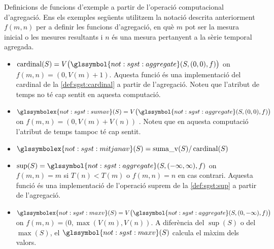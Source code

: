 \begin{example}
  Definicions de funcions d'exemple a partir de l'operació
  computacional d'agregació. Ens els exemples següents utilitzem la
  notació descrita anteriorment $f(m,n)$ per a definir les funcions
  d'agregació, en què $m$ pot ser la mesura inicial o les mesures
  resultants i $n$ és una mesura pertanyent a la sèrie temporal
  agregada.

\begin{itemize}
\item $\operatorname{cardinal}( S) = V\big(
  \glssymbol{not:sgst:aggregate} (S,(0,0),f) \big)$ on
  $f(m,n)=(0,V(m)+1)$. Aquesta funció és una implementació del
  cardinal de la \autoref{def:sgst:cardinal} a partir de
  l'agregació. Noteu que l'atribut de temps no té cap sentit en
  aquesta computació.


\item $\glssymbolex{not:sgst:sumav}(S) =V\big(
  \glssymbol{not:sgst:aggregate} (S,(0,0),f ) \big)$ on
  $f(m,n)=(0,V(m)+V(n))$ \label{def:sgst:sumav}. Noteu que en aquesta
  computació l'atribut de temps tampoc té cap sentit.

\item $\glssymbolex{not:sgst:mitjanav}(S)=
  \operatorname{suma\_v}(S) / \operatorname{cardinal}(S)$ \label{def:sgst:mitjanav}

\item $\operatorname{sup}(S)=
  \glssymbol{not:sgst:aggregate}(S,(-\infty,\infty),f )$ on $f(m,n)=
  m$ si $T(n)<T(m)$ o $f(m,n)= n$ en cas contrari. Aquesta funció és una
  implementació de l'operació suprem de la \autoref{def:sgst:sup} a
  partir de l'agregació.

\item $\glssymbolex{not:sgst:maxv}(S)= V\big(
  \glssymbol{not:sgst:aggregate}
  (S,(0,-\infty),f ) \big)$ on
  $f(m,n)=(0,\max(V(m),V(n))$. A diferència del $\sup(S)$ o del
  $\max(S)$, el $\glssymbol{not:sgst:maxv}(S)$ calcula el màxim dels
  valors.   \label{def:sgst:maxv}



\end{itemize}
\end{example}

